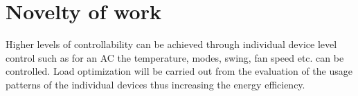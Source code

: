         \section{Novelty of work}
        	Higher levels of controllability can be achieved through individual device level control such as for an AC the temperature, modes, swing, fan speed etc. can be controlled. Load optimization will be carried out from the evaluation of the usage patterns of the individual devices thus increasing the energy efficiency. 
    